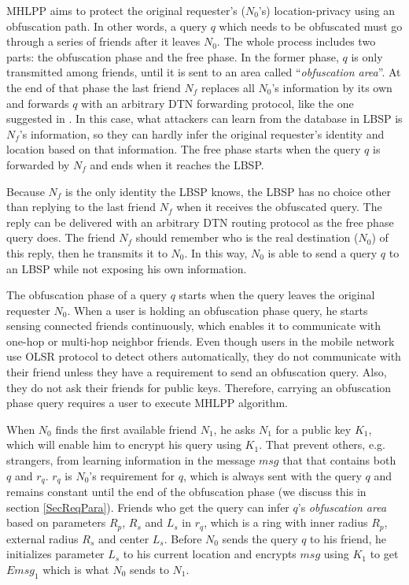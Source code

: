 \noindent MHLPP aims to protect the original requester's ($N_0$'s) location-privacy using an obfuscation path. In other words, a query $q$ which needs to be obfuscated must go through a series of friends after it leaves $N_0$. The whole process includes two parts: the obfuscation phase and the free phase. In the former phase, $q$ is only transmitted among friends, until it is sent to an area called ``\textit{obfuscation area}''. At the end of that phase the last friend $N_f$ replaces all $N_0$'s information by its own and forwards $q$ with an arbitrary DTN forwarding protocol, like the one suggested in \cite{C31}. In this case, what attackers can learn from the database in LBSP is $N_f$'s information, so they can hardly infer the original requester's identity and location based on that information. The free phase starts when the query $q$ is forwarded by $N_f$ and ends when it reaches the LBSP. 

Because $N_f$ is the only identity the LBSP knows, the LBSP has no choice other than replying to the last friend $N_f$ when it receives the obfuscated query. The reply can be delivered with an arbitrary DTN routing protocol as the free phase query does. The friend $N_f$ should remember who is the real destination ($N_0$) of this reply, then he transmits it to $N_0$. In this way, $N_0$ is able to send a query $q$ to an LBSP while not exposing his own information.

The obfuscation phase of a query $q$ starts when the query leaves the original requester $N_0$. When a user is holding an obfuscation phase query, he starts sensing connected friends continuously, which enables it to communicate with one-hop or multi-hop neighbor friends. Even though users in the mobile network use OLSR protocol \cite{C29} to detect others automatically, they do not communicate with their friend unless they have a requirement to send an obfuscation query. Also, they do not ask their friends for public keys. Therefore, carrying an obfuscation phase query requires a user to execute MHLPP algorithm.

When $N_0$ finds the first available friend $N_1$, he asks $N_1$ for a public key $K_1$, which will enable him to encrypt his query using $K_1$. That prevent others, e.g. strangers, from learning information in the message $msg$ that that contains both $q$ and $r_q$. $r_q$ is $N_0$'s requirement for $q$, which is always sent with the query $q$ and remains constant until the end of the obfuscation phase (we discuss this in section \ref{SecReqPara}). Friends who get the query can infer $q$'s \textit{obfuscation area} based on parameters $R_p$, $R_s$ and $L_s$ in $r_q$, which is a ring with inner radius $R_p$, external radius $R_s$ and center $L_s$. Before $N_0$ sends the query $q$ to his friend, he initializes parameter $L_s$ to his current location and encrypts $msg$ using $K_1$ to get ${Emsg}_1$ which is what $N_0$ sends to ${N}_1$.

